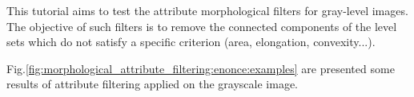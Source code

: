 \def\difficulty{2}
\begin{note}This tutorial aims to test the attribute morphological filters for gray-level images. The objective of such filters is to remove the connected components of the level sets which do not satisfy a specific criterion (area, elongation, convexity...).\end{note}
%

%

\noindent Fig.\ref{fig:morphological_attribute_filtering:enonce:examples} are presented some results of attribute filtering applied on the grayscale image.

\vspace*{-5pt}

